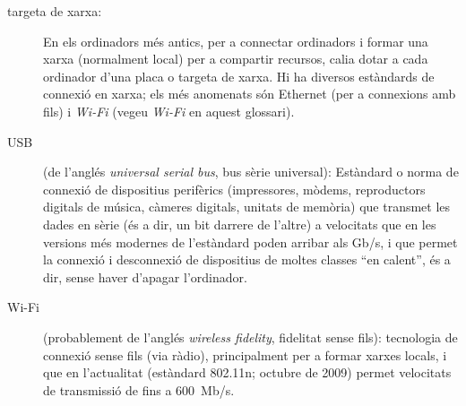 \begin{description}
\item[targeta de xarxa:] En els ordinadors més antics, per a connectar
  ordinadors i formar una xarxa (normalment local) per a compartir
  recursos, calia dotar a cada ordinador d'una placa o targeta de
  xarxa. Hi ha diversos estàndards de connexió en xarxa; els més
  anomenats són Ethernet (per a connexions amb fils) i \emph{Wi-Fi}
  (vegeu \emph{Wi-Fi} en aquest glossari).

\item[USB] (de l'anglés \emph{universal serial bus}, bus sèrie
  universal): Estàndard o norma de connexió de dispositius perifèrics
  (impressores, mòdems, reproductors digitals de música, càmeres
  digitals, unitats de memòria) que transmet les dades en sèrie (és a
  dir, un bit darrere de l'altre) a velocitats que en les versions més
  modernes de l'estàndard poden arribar als Gb/s, i que permet la
  connexió i desconnexió de dispositius de moltes classes ``en
  calent'', és a dir, sense haver d'apagar l'ordinador.

\item[Wi-Fi] (probablement de l'anglés \emph{wireless fidelity},
  fidelitat sense fils): tecnologia de connexió sense fils (via
  ràdio), principalment per a formar xarxes locals, i que en
  l'actualitat (estàndard 802.11n; octubre de 2009) permet velocitats
  de transmissió de fins a 600~Mb/s. 
\end{description}


